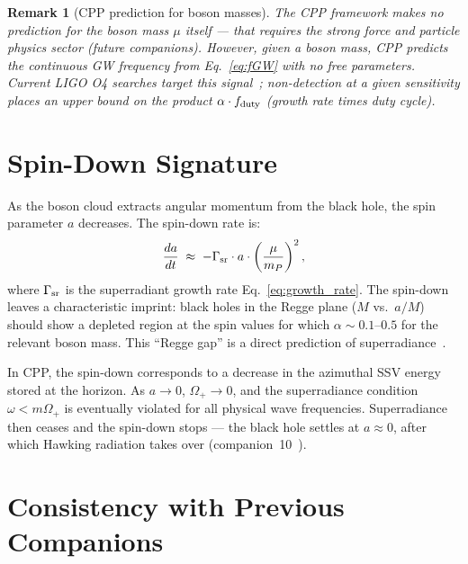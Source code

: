 \documentclass[12pt]{article}
\newtheorem{remark}[theorem]{Remark}
\newcommand{\mP}{m_P}
\newcommand{\Oplus}{\Omega_+}
\begin{document}
\begin{remark}[CPP prediction for boson masses]
The CPP framework makes no prediction for the boson mass $\mu$ itself
— that requires the strong force and particle physics sector (future
companions).  However, given a boson mass, CPP predicts the continuous
GW frequency from Eq.~\eqref{eq:fGW} with no free parameters.  Current
LIGO O4 searches target this signal~\cite{ligo_sr2023}; non-detection
at a given sensitivity places an upper bound on the product $\alpha
\cdot f_{\rm duty}$ (growth rate times duty cycle).
\end{remark}

\section{Spin-Down Signature}
\label{sec:spindown}

As the boson cloud extracts angular momentum from the black hole, the
spin parameter $a$ decreases.  The spin-down rate is:
\begin{equation}
  \frac{da}{dt} \;\approx\; -\Gamma_{\rm sr}\cdot a\cdot
  \left(\frac{\mu}{\mP}\right)^2,
  \label{eq:spindown}
\end{equation}
where $\Gamma_{\rm sr}$ is the superradiant growth rate
Eq.~\eqref{eq:growth_rate}.  The spin-down leaves a characteristic
imprint: black holes in the Regge plane ($M$ vs.\ $a/M$) should show a
depleted region at the spin values for which $\alpha \sim 0.1$--$0.5$
for the relevant boson mass.  This ``Regge gap'' is a direct prediction
of superradiance~\cite{arvanitaki2015}.

In CPP, the spin-down corresponds to a decrease in the azimuthal SSV
energy stored at the horizon.  As $a \to 0$, $\Oplus \to 0$, and
the superradiance condition $\omega < m\Oplus$ is eventually violated
for all physical wave frequencies.  Superradiance then ceases and the
spin-down stops — the black hole settles at $a \approx 0$, after
which Hawking radiation takes over (companion~10~\cite{c10}).

\section{Consistency with Previous Companions}
\label{sec:consistency}
\end{document}
